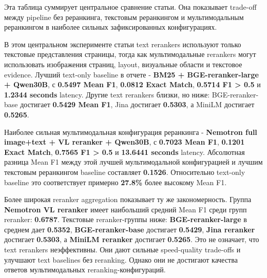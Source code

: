 \documentclass[conference]{IEEEtran}
\begin{document}
Эта таблица суммирует центральное сравнение статьи. Она показывает trade-off между pipeline без реранкинга, текстовым реранкингом и мультимодальным реранкингом в наиболее сильных зафиксированных конфигурациях.

В этом центральном эксперименте статьи text rerankers используют только текстовые представления страницы, тогда как мультимодальные rerankers могут использовать изображения страниц, layout, визуальные области и текстовое evidence. Лучший text-only baseline в отчете - \textbf{BM25 + BGE-reranker-large + Qwen30B}, с \textbf{0.5497 Mean F1}, \textbf{0.0812 Exact Match}, \textbf{0.5714 F1 > 0.5} и \textbf{1.2344 seconds} latency. Другие text rerankers близки, но ниже: BGE-reranker-base достигает \textbf{0.5429 Mean F1}, Jina достигает \textbf{0.5303}, а MiniLM достигает \textbf{0.5265}.

Наиболее сильная мультимодальная конфигурация реранкинга - \textbf{Nemotron full image+text + VL reranker + Qwen30B}, с \textbf{0.7023 Mean F1}, \textbf{0.1201 Exact Match}, \textbf{0.7565 F1 > 0.5} и \textbf{13.6441 seconds} latency. Абсолютная разница Mean F1 между этой лучшей мультимодальной конфигурацией и лучшим текстовым реранкингом baseline составляет \textbf{0.1526}. Относительно text-only baseline это соответствует примерно \textbf{27.8\%} более высокому Mean F1.

Более широкая reranker aggregation показывает ту же закономерность. Группа \textbf{Nemotron VL reranker} имеет наибольший средний Mean F1 среди групп reranker: \textbf{0.6787}. Текстовые reranker-группы ниже: \textbf{BGE-reranker-large} в среднем дает \textbf{0.5352}, \textbf{BGE-reranker-base} достигает \textbf{0.5429}, \textbf{Jina reranker} достигает \textbf{0.5303}, а \textbf{MiniLM reranker} достигает \textbf{0.5265}. Это не означает, что text rerankers неэффективны. Они дают сильные speed-quality trade-offs и улучшают text baselines без reranking. Однако они не достигают качества ответов мультимодальных reranking-конфигураций.

\begin{table}[t]
\caption{Таблица 5}
\centering
\scriptsize
{}
\end{table}
\end{document}
